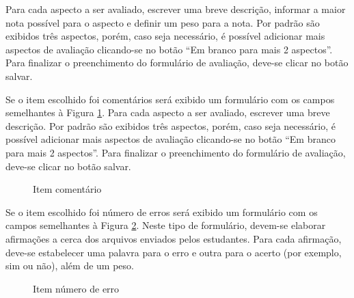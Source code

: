 Para cada aspecto a ser avaliado, escrever uma breve descrição, informar a maior nota possível para o aspecto e definir um peso para a nota. Por padrão são exibidos três aspectos, porém, caso seja necessário, é possível adicionar mais aspectos de avaliação clicando-se no botão “Em branco para mais 2 aspectos”. Para finalizar o preenchimento do formulário de avaliação, deve-se clicar no botão salvar.

Se o item escolhido foi comentários será exibido um formulário com os campos semelhantes à Figura \ref{fig:item_comentario}. Para cada aspecto a ser avaliado, escrever uma breve descrição. Por padrão são exibidos três aspectos, porém, caso seja necessário, é possível adicionar mais aspectos de avaliação clicando-se no botão “Em branco para mais 2 aspectos”. Para finalizar o preenchimento do formulário de avaliação, deve-se clicar no botão salvar.

\begin{figure}[htbp]
 \begin{center}
  \caption{Item comentário}
  \label{fig:item_comentario}
 \end{center}
\end{figure}


Se o item escolhido foi número de erros será exibido um formulário com os campos semelhantes à Figura \ref{fig:item_numero_erro}. Neste tipo de formulário, devem-se elaborar afirmações a cerca dos arquivos enviados pelos estudantes. Para cada afirmação, deve-se estabelecer uma palavra para o erro e outra para o acerto (por exemplo, sim ou não), além de um peso.

\begin{figure}[htbp]
 \begin{center}
  \caption{Item número de erro}
  \label{fig:item_numero_erro}
 \end{center}
\end{figure}

